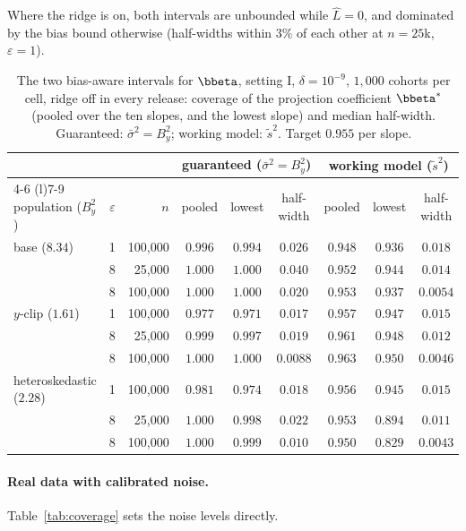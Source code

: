 Where the ridge is on, both intervals are unbounded while $\hat L = 0$, and dominated by the bias bound otherwise (half-widths within $3\%$ of each other at $n = 25$k, $\varepsilon = 1$).

\begin{table}[ht]
  \centering\small
  \caption{The two bias-aware intervals for $\bbeta$, setting I, $\delta = 10^{-9}$, $1{,}000$ cohorts per cell, ridge off in every release: coverage of the projection coefficient $\bbeta^\ast$ (pooled over the ten slopes, and the lowest slope) and median half-width. Guaranteed: $\bar\sigma^2 = B_y^2$; working model: $\tilde s^2$. Target $0.955$ per slope.}
  \label{tab:sigmabar}
  \footnotesize
  \setlength{\tabcolsep}{3pt}
  \begin{tabular}{@{}lrrcccccc@{}}
    \toprule
    & & & \multicolumn{3}{c}{guaranteed ($\bar\sigma^2 = B_y^2$)} & \multicolumn{3}{c}{working model ($\tilde s^2$)} \\
    \cmidrule(lr){4-6} \cmidrule(l){7-9}
    population ($B_y^2$) & $\varepsilon$ & $n$ & pooled & lowest & half-width & pooled & lowest & half-width \\
    \midrule
    base ($8.34$) & 1 & 100{,}000 & $0.996$ & $0.994$ & $0.026$ & $0.948$ & $0.936$ & $0.018$ \\
     & 8 & 25{,}000 & $1.000$ & $1.000$ & $0.040$ & $0.952$ & $0.944$ & $0.014$ \\
     & 8 & 100{,}000 & $1.000$ & $1.000$ & $0.020$ & $0.953$ & $0.937$ & $0.0054$ \\
    \addlinespace
    $y$-clip ($1.61$) & 1 & 100{,}000 & $0.977$ & $0.971$ & $0.017$ & $0.957$ & $0.947$ & $0.015$ \\
     & 8 & 25{,}000 & $0.999$ & $0.997$ & $0.019$ & $0.961$ & $0.948$ & $0.012$ \\
     & 8 & 100{,}000 & $1.000$ & $1.000$ & $0.0088$ & $0.963$ & $0.950$ & $0.0046$ \\
    \addlinespace
    heteroskedastic ($2.28$) & 1 & 100{,}000 & $0.981$ & $0.974$ & $0.018$ & $0.956$ & $0.945$ & $0.015$ \\
     & 8 & 25{,}000 & $1.000$ & $0.998$ & $0.022$ & $0.953$ & $0.894$ & $0.011$ \\
     & 8 & 100{,}000 & $1.000$ & $0.999$ & $0.010$ & $0.950$ & $0.829$ & $0.0043$ \\
    \bottomrule
  \end{tabular}
\end{table}

\paragraph{Real data with calibrated noise.} Table~\ref{tab:coverage} sets the noise levels directly.

